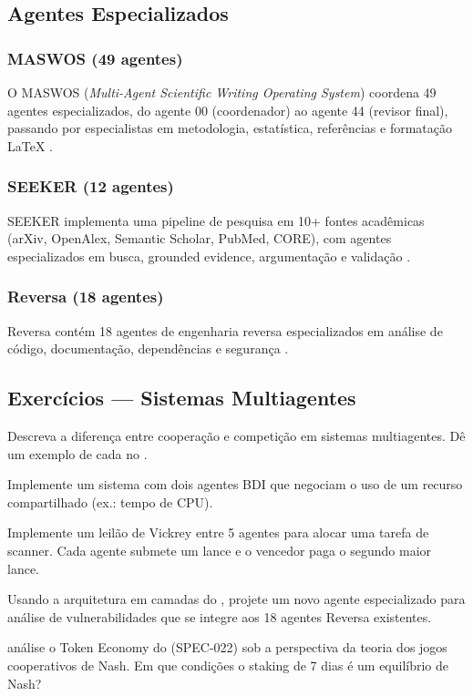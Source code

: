 \subsection{Agentes Especializados}
\subsubsection*{MASWOS (49 agentes)}
O MASWOS (\textit{Multi-Agent Scientific Writing Operating System}) coordena
49 agentes especializados, do agente 00 (coordenador) ao agente 44
(revisor final), passando por especialistas em metodologia, estatística,
referências e formatação LaTeX \cite{opencode2026maswos}.
\subsubsection*{SEEKER (12 agentes)}
SEEKER implementa uma pipeline de pesquisa em 10+ fontes acadêmicas
(arXiv, OpenAlex, Semantic Scholar, PubMed, CORE), com agentes
especializados em busca, grounded evidence, argumentação e validação
\cite{opencode2026seeker}.
\subsubsection*{Reversa (18 agentes)}
Reversa contém 18 agentes de engenharia reversa especializados em análise
de código, documentação, dependências e segurança \cite{opencode2026reversa}.
\subsection{Exercícios — Sistemas Multiagentes}
\begin{exercicio}
Descreva a diferença entre cooperação e competição em sistemas multiagentes.
Dê um exemplo de cada no \opencodeeco{}.
\end{exercicio}
\begin{exercicio}
Implemente um sistema com dois agentes BDI que negociam o uso de um recurso
compartilhado (ex.: tempo de CPU).
\end{exercicio}
\begin{exercicio}
Implemente um leilão de Vickrey entre 5 agentes para alocar uma tarefa de
scanner. Cada agente submete um lance e o vencedor paga o segundo maior
lance.
\end{exercicio}
\begin{exercicio}
Usando a arquitetura em camadas do \opencodeeco{}, projete um novo agente
especializado para análise de vulnerabilidades que se integre aos 18 agentes
Reversa existentes.
\end{exercicio}
\begin{exercicio}
análise o Token Economy do \opencodeeco{} (SPEC-022) sob a perspectiva da
teoria dos jogos cooperativos de Nash. Em que condições o staking de 7 dias
é um equilíbrio de Nash?
\end{exercicio}
